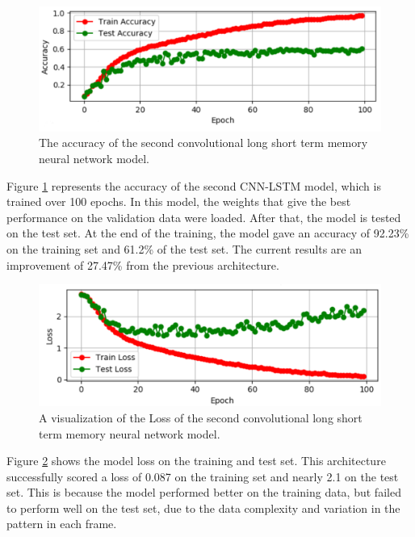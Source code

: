 \begin{figure}[ht]
\centering
\includegraphics[width=1.0\columnwidth]{Figures/accuracycnnlstmmodel}
\decoRule
\caption[The accuracy of the second convolutional long short term memory neural network model.]{The accuracy of the second convolutional long short term memory neural network model.}
\label{fig:accuracycnnlstmmodel} 
\end{figure}

Figure \ref{fig:accuracycnnlstmmodel} represents the accuracy of the second CNN-LSTM model, which is trained over 100 epochs. In this model, the weights that give the best performance on the validation data were loaded. After that, the model is tested on the test set. At the end of the training, the model gave an accuracy of 92.23\% on the training set and 61.2\% of the test set. The current results are an improvement of 27.47\% from the previous architecture.

\begin{figure}[ht]
\centering
\includegraphics[width=1.0\columnwidth]{Figures/losscnnlstmmodel}
\decoRule
\caption[A visualization of the Loss of the second convolutional long short term memory neural network model.]{A visualization of the Loss of the second convolutional long short term memory neural network model.}
\label{fig:losscnnlstmmodel}
\end{figure}

Figure \ref{fig:losscnnlstmmodel} shows the model loss on the training and test set. This architecture successfully scored a loss of 0.087 on the training set and nearly 2.1 on the test set. This is because the model performed better on the training data, but failed to perform well on the test set, due to the data complexity and variation in the pattern in each frame.\\

